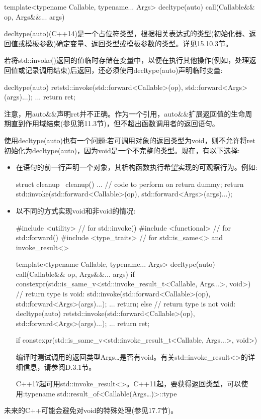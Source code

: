 \begin{cpp}
template<typename Callable, typename... Args>
decltype(auto) call(Callable&& op, Args&&... args)
\end{cpp}

decltype(auto)(C++14)是一个占位符类型，根据相关表达式的类型(初始化器、返回值或模板参数)确定变量、返回类型或模板参数的类型。详见15.10.3节。

若将std::invoke()返回的值临时存储在变量中，以便在执行其他操作(例如，处理返回值或记录调用结束)后返回，还必须使用decltype(auto)声明临时变量:

\begin{cpp}
decltype(auto) ret{std::invoke(std::forward<Callable>(op),
				   std::forward<Args>(args)...)};
...
return ret;
\end{cpp}

注意，用auto\&\&声明ret并不正确。作为一个引用，auto\&\&扩展返回值的生命周期直到作用域结束(参见第11.3节)，但不超出函数调用者的返回语句。

使用decltype(auto)也有一个问题:若可调用对象的返回类型为void，则不允许将ret初始化为decltype(auto)，因为void是一个不完整的类型。现在，有以下选择:

\begin{itemize}
\item
在语句的前一行声明一个对象，其析构函数执行希望实现的可观察行为。例如:

\begin{cpp}
struct cleanup {
	~cleanup() {
		... // code to perform on return
	}
} dummy;
return std::invoke(std::forward<Callable>(op),
					std::forward<Args>(args)...);
\end{cpp}

\item
以不同的方式实现void和非void的情况:

\begin{cpp}
#include <utility> // for std::invoke()
#include <functional> // for std::forward()
#include <type_traits> // for std::is_same<> and invoke_result<>

template<typename Callable, typename... Args>
decltype(auto) call(Callable&& op, Args&&... args)
{
	if constexpr(std::is_same_v<std::invoke_result_t<Callable, Args...>,
	void>) {
		// return type is void:
		std::invoke(std::forward<Callable>(op),
					std::forward<Args>(args)...);
		...
		return;
	}
	else {
		// return type is not void:
		decltype(auto) ret{std::invoke(std::forward<Callable>(op),
							std::forward<Args>(args)...)};
		...
		return ret;
	}
}
\end{cpp}

\begin{cpp}
if constexpr(std::is_same_v<std::invoke_result_t<Callable, Args...>, void>)
\end{cpp}

编译时测试调用的返回类型Args…是否有void。有关std::invoke\_result<>的详细信息，请参阅D.3.1节。

\begin{notice}C++17起可用std::invoke\_result<>。C++11起，要获得返回类型，可以使用:typename std::result\_of<Callable(Args…)>::type
\end{notice}

\end{itemize}

未来的C++可能会避免对void的特殊处理(参见17.7节)。












